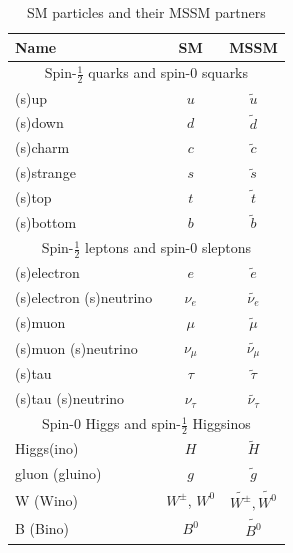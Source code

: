 			\begin{table}[!thp]
				\centering
				\caption{\gls{SM} particles and their \gls{MSSM} partners \cite{pdg}}
				\begin{tabular}{| l | c | c |}
				\hline
				Name 				& \gls{SM} 	& \gls{MSSM} \\[1ex] \hline
				\multicolumn{3}{|c|}{Spin-$\frac{1}{2}$ quarks and spin-$0$ squarks} \\[1ex] \hline
				(s)up 				& $u$ 	& $\tilde{u}$ \\[1ex] \hline
				(s)down 			& $d$ 	& $\tilde{d}$ \\[1ex] \hline
				(s)charm 			& $c$ 	& $\tilde{c}$ \\[1ex] \hline
				(s)strange 			& $s$		& $\tilde{s}$ \\[1ex] \hline
				(s)top 				& $t$ 	& $\tilde{t}$ \\[1ex] \hline
				(s)bottom 			& $b$ 	& $\tilde{b}$ \\[1ex] \hline
				\multicolumn{3}{|c|}{Spin-$\frac{1}{2}$ leptons and spin-$0$ sleptons} \\[1ex] \hline
				(s)electron 		& $e$ 	& $\tilde{e}$ \\[1ex] \hline
				(s)electron (s)neutrino 	& $\nu_e$ 	& $\widetilde{\nu_e}$ \\[1ex] \hline
				(s)muon 			& $\mu$ 	& $\tilde{\mu}$ \\[1ex] \hline
				(s)muon (s)neutrino & $\nu_\mu$ 	& $\widetilde{\nu_\mu}$ \\[1ex] \hline
				(s)tau 				& $\tau$ 	& $\tilde{\tau}$ \\[1ex] \hline
				(s)tau (s)neutrino 	& $\nu_\tau$ 	& $\widetilde{\nu_\tau}$ \\[1ex] \hline
				\multicolumn{3}{|c|}{Spin-$0$ Higgs and spin-$\frac{1}{2}$ Higgsinos} \\[1ex] \hline
				Higgs(ino)			& $H$ 	& $\tilde{H}$ \\[1ex] \hline
				gluon (gluino) 		& $g$ 	& $\tilde{g}$ \\[1ex] \hline
				W (Wino) 			& $W^{\pm}$, $W^0$ & $\widetilde{W^\pm}, \widetilde{W^0}$ \\[1ex] \hline
				B (Bino) 			& $B^0$ & $\widetilde{B^0}$ \\[1ex] \hline

 				\end{tabular}
				\label{tab:MSSM}
			\end{table}

